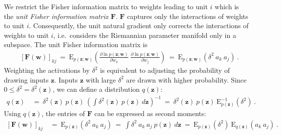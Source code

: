 \documentclass{article}
\newcommand\Bw{\bm{w}}
\newcommand\Bz{\bm{z}}
\newcommand\BF{\bm{F}}
\newcommand\EXP{\mathbf{\mathrm{E}}}
\begin{document}
We restrict the Fisher information matrix to weights leading to
unit $i$ which is the {\em unit Fisher information matrix} $\BF$.
$\BF$ captures only the interactions of weights to
unit $i$. Consequently, the unit natural gradient only corrects
the interactions of weights to unit $i$, i.e.\ considers the
Riemannian parameter manifold only in a subspace.
The unit Fisher information matrix is
\begin{align}
&\left[\BF(\Bw)\right]_{kj} \ = \  \EXP_{p(\Bz;\Bw)} \! \left(
 \frac{\partial \ln p(\Bz;\Bw) }{\partial w_{k}}
\ \frac{\partial \ln p(\Bz;\Bw) }{\partial w_{j}} \right)
 \ = \ \EXP_{p(\Bz;\Bw)} (\delta^2 \ a_k \ a_j )  \ .
\end{align}
Weighting the activations by
$\delta^2$ is equivalent to
adjusting the probability of drawing inputs $\Bz$. Inputs $\Bz$ with large
$\delta^2$ are drawn with higher probability.
Since $0 \leq \delta^2=\delta^2(\Bz)$, we can define a
distribution  $q(\Bz)$:
\begin{align}
q(\Bz) \ &= \ \delta^2(\Bz) \
  p(\Bz) \ \left(\int \delta^2(\Bz) \ p(\Bz) \ d\Bz \right)^{-1}
\ = \ \delta^2(\Bz) \
  p(\Bz) \ \EXP_{p(\Bz)}^{-1} (\delta^2 )  \ .
\end{align}
Using $q(\Bz)$, the entries of $\BF$ can be expressed as second moments:
\begin{align}
\left[\BF(\Bw)\right]_{kj} \ &= \ \EXP_{p(\Bz)} (
  \delta^2  \ a_k \ a_j )
\ = \
 \int  \delta^2  \ a_k \ a_j \ p(\Bz) \ d\Bz
\ = \  \EXP_{p(\Bz)} (\delta^2 ) \ \EXP_{q(\Bz)}( a_k \ a_j ) \ .
\end{align}
\end{document}
